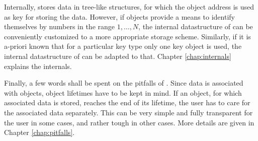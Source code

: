 Internally, {\ViennaData} stores data in tree-like structures, for which the object address is used as key for storing the data. 
However, if objects provide a means to identify themselves by numbers in the range $1, \ldots, N$, the internal datastructure of {\ViennaData} can be 
conveniently customized to a more appropriate storage scheme. Similarly, if it is a-priori known that for a particular key type only one key object is used, the
internal datastructure of {\ViennaData} can be adapted to that. Chapter \ref{chap:internals} explains the internals.

Finally, a few words shall be spent on the pitfalls of {\ViennaData}. Since data is associated with objects, object lifetimes have to be kept in mind.
If an object, for which associated data is stored, reaches the end of its lifetime, the user has to care for the associated data separately.
This can be very simple and fully transparent for the user in some cases, and rather tough in other cases. More details are given in Chapter \ref{chap:pitfalls}.
 
